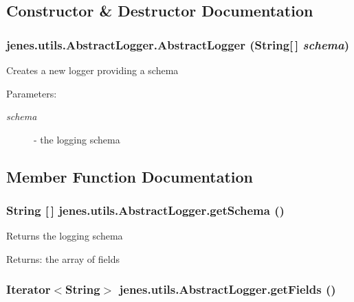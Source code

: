 \subsection{Constructor \& Destructor Documentation}
\hypertarget{classjenes_1_1utils_1_1_abstract_logger_357a64e024ede4da833b79455ba63644}{
\subsubsection[AbstractLogger]{\setlength{\rightskip}{0pt plus 5cm}jenes.utils.AbstractLogger.AbstractLogger (String\mbox{[}$\,$\mbox{]} {\em schema})}}
\label{classjenes_1_1utils_1_1_abstract_logger_357a64e024ede4da833b79455ba63644}


Creates a new logger providing a schema

\begin{Desc}
\item[Parameters:]
\begin{description}
\item[{\em schema}]- the logging schema \end{description}
\end{Desc}


\subsection{Member Function Documentation}
\hypertarget{classjenes_1_1utils_1_1_abstract_logger_3f4dc79a211f8e01c621d42dec8d4de2}{
\subsubsection[getSchema]{\setlength{\rightskip}{0pt plus 5cm}String \mbox{[}$\,$\mbox{]} jenes.utils.AbstractLogger.getSchema ()}}
\label{classjenes_1_1utils_1_1_abstract_logger_3f4dc79a211f8e01c621d42dec8d4de2}


Returns the logging schema

\begin{Desc}
\item[Returns:]the array of fields \end{Desc}
\hypertarget{classjenes_1_1utils_1_1_abstract_logger_e939c8578c5342d8f11ff61388ddfd80}{
\subsubsection[getFields]{\setlength{\rightskip}{0pt plus 5cm}Iterator$<$String$>$ jenes.utils.AbstractLogger.getFields ()}}
\label{classjenes_1_1utils_1_1_abstract_logger_e939c8578c5342d8f11ff61388ddfd80}


